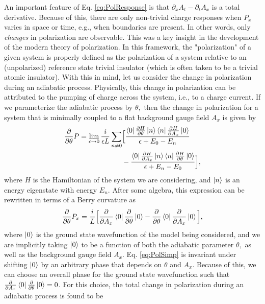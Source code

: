 \documentclass[prb,aps,twocolumn,groupaddress,floatfix]{revtex4-1}
\begin{document}
An important feature of Eq. \ref{eq:PolResponse} is that $\partial_x A_t - \partial_t A_x$ is a total derivative. Because of this, there are only non-trivial charge responses when $P_x$ varies in space or time, e.g., when boundaries are present. In other words, only \textit{changes} in polarization are observable. This was a key insight in the development of the modern theory of polarization\cite{resta1992theory, king1993, resta1994macroscopic}. In this framework, the "polarization" of a given system is properly defined as the polarization of a system relative to an (unpolarized) reference state trivial insulator (which is often taken to be a trivial atomic insulator). With this in mind, let us consider the change in polarization during an adiabatic process. Physically, this change in polarization can be attributed to the pumping of charge across the system, i.e., to a charge current. If we parameterize the adiabatic process by $\theta,$ then the change in polarization for a system that is minimally coupled to a flat background gauge field $A_{x}$ is given by
\begin{equation}
\begin{split}
\frac{\partial}{\partial \theta} P = \lim_{\epsilon \rightarrow 0}\frac{i}{\epsilon L}\sum_{n\neq 0}&\Big[\frac{\bra{0} \frac{\partial H}{\partial\theta}\ket{n}\bra{n} \frac{\partial H}{\partial{A_x}} \ket{0}}{\epsilon + E_0 - E_n}\\ &-  \frac{\bra{0} \frac{\partial H}{\partial{A_x}}\ket{n}\bra{n} \frac{\partial H}{\partial\theta} \ket{0}}{\epsilon + E_n - E_0}\Big],\label{eq:KuboSpectralPol}
\end{split}
\end{equation}
where $H$ is the Hamiltonian of the system we are considering, and $\ket{n}$ is an energy eigenstate with energy $E_n$. After some algebra, this expression can be rewritten in terms of a Berry curvature as
\begin{equation}
\frac{\partial}{\partial \theta} P_x =  \frac{i}{ L} \Big[ \frac{\partial}{\partial A_{x}} \bra{0} \frac{\partial}{\partial \theta} \ket{0}-  \frac{\partial}{\partial \theta} \bra{0} \frac{\partial}{\partial A_{x}} \ket{0}\Big],
\label{eq:PolSimp}
\end{equation}
where $\ket{0}$ is the ground state wavefunction of the model being considered, and we are implicitly taking $\ket{0}$ to be a function of both the adiabatic parameter $\theta,$ as well as the background gauge field $A_x$. Eq. \ref{eq:PolSimp} is invariant under shifting $\ket{0}$ by an arbitrary phase that depends on $\theta$ and $A_x$. Because of this, we can choose an overall phase for the ground state wavefunction such that $\frac{\partial}{\partial A_{x}} \bra{0} \frac{\partial}{\partial \theta } \ket{0} = 0$. For this choice, the total change in polarization during an adiabatic process is found to be 
\end{document}

